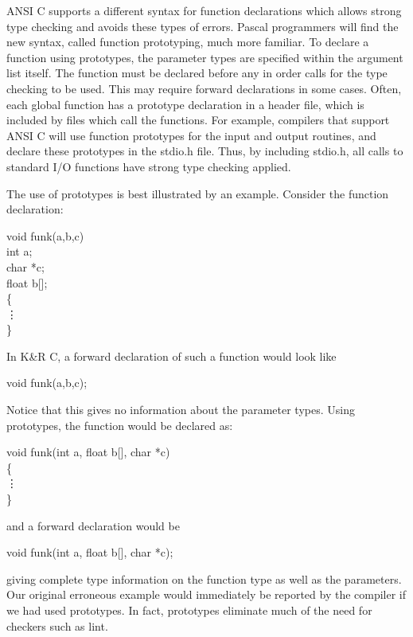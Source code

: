ANSI C supports a different syntax for function declarations which
allows strong type checking and avoids these types of errors. Pascal
programmers will find the new syntax, called {\kc function
prototyping}, much more familiar. To declare a function using
prototypes, the parameter types are specified within the argument
list itself. The function must be declared before any in order calls for the
type checking to be used. This may require forward declarations in
some cases. Often, each global function has a prototype declaration
in a header file, which is included by files which call the
functions. For example, compilers that support ANSI C will use
function prototypes for the input and output routines, and declare
these prototypes in the {\fn stdio.h} file. Thus, 
by including {\fn stdio.h}, all calls to standard I/O functions have strong type
checking applied.

The use of prototypes is best illustrated by an example. Consider the
function declaration:
\begin{code}
void funk(a,b,c)	\\
\> int a;			\\
\> char *c;			\\
\> float b[];		\\
\{						\\
 \> \vdots			\\
\}
\end{code}
\noindent
In K\&R C, a forward declaration of such a function would look like
\begin{code}
void funk(a,b,c);
\end{code}
\noindent
Notice that this gives no information about the parameter types.
Using prototypes, the function would be declared as:
\begin{code}
void funk(int a, float b[], char *c) \\
\{												 \\
 \> \vdots									 \\
\}
\end{code}
\noindent
and a forward declaration would be
\begin{code}
void funk(int a, float b[], char *c);
\end{code}
\noindent
 giving complete type information on the function type as well as the
parameters. Our original erroneous example would immediately be
reported by the compiler if we had used prototypes. In fact,
prototypes eliminate much of the need for checkers such as {\cmd
lint}.


